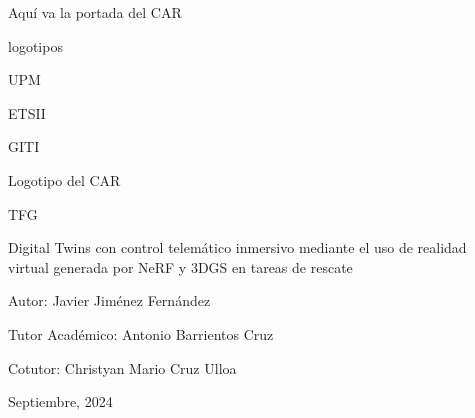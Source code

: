 \documentclass[a4paper, 12pt, spanish, twoside]{article}
\newcommand\blankpage{%
    \null
    \thispagestyle{empty}%
    \newpage}
\begin{document}




\newpage
\thispagestyle{empty}



\clearpage
\blankpage








\newpage
\thispagestyle{empty}

%
Aquí va la portada del CAR 

logotipos 

UPM

ETSII

GITI 

Logotipo del CAR 

TFG

Digital Twins con control telemático inmersivo mediante el uso de realidad virtual generada por NeRF y 3DGS en tareas de rescate

Autor: Javier Jiménez Fernández

Tutor Académico: Antonio Barrientos Cruz

Cotutor:  Christyan Mario Cruz Ulloa

Septiembre, 2024

\clearpage
\afterpage{\blankpage}
\end{document}
